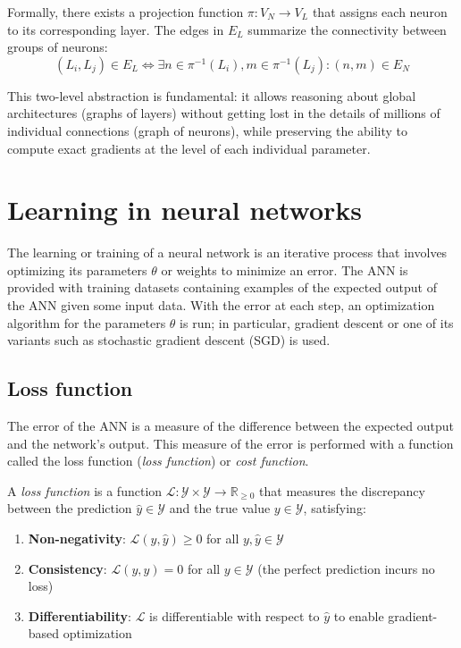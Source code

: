 Formally, there exists a projection function $\pi: V_N \to V_L$ that assigns each neuron to its corresponding layer. The edges in $E_L$ summarize the connectivity between groups of neurons:
\[
(L_i, L_j) \in E_L \iff \exists n \in \pi^{-1}(L_i), m \in \pi^{-1}(L_j) : (n, m) \in E_N
\]

This two-level abstraction is fundamental: it allows reasoning about global architectures (graphs of layers) without getting lost in the details of millions of individual connections (graph of neurons), while preserving the ability to compute exact gradients at the level of each individual parameter.

\section{Learning in neural networks}\label{sec:learning_ann}

The learning or training of a neural network is an iterative process that involves optimizing its parameters \(\theta\) or weights to minimize an error. The \gls{ANN} is provided with training datasets containing examples of the expected output of the \gls{ANN} given some input data. With the error at each step, an optimization algorithm for the parameters \(\theta\) is run; in particular, gradient descent or one of its variants such as stochastic gradient descent (\gls{SGD}) is used.

\subsection{Loss function}

The error of the \gls{ANN} is a measure of the difference between the expected output and the network's output. This measure of the error is performed with a function called the loss function (\emph{loss function}) or \textit{cost function}.

\begin{definition}\label{def:funcion_perdida}
	A \textit{loss function} is a function \(\mathcal{L}: \mathcal{Y} \times \mathcal{Y} \to \mathbb{R}_{\geq 0}\) that measures the discrepancy between the prediction \(\hat{y} \in \mathcal{Y}\) and the true value \(y \in \mathcal{Y}\), satisfying:
	\begin{enumerate}
		\item \textbf{Non-negativity}: \(\mathcal{L}(y, \hat{y}) \geq 0\) for all \(y, \hat{y} \in \mathcal{Y}\)
		\item \textbf{Consistency}: \(\mathcal{L}(y, y) = 0\) for all \(y \in \mathcal{Y}\) (the perfect prediction incurs no loss)
		\item \textbf{Differentiability}: \(\mathcal{L}\) is differentiable with respect to \(\hat{y}\) to enable gradient-based optimization
	\end{enumerate}
\end{definition}

